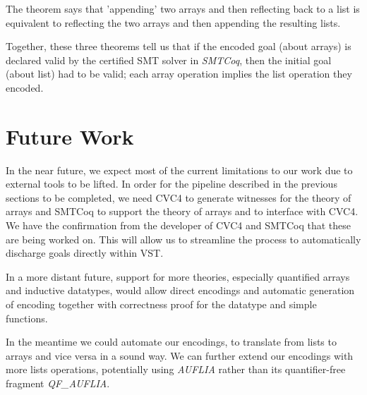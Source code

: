 \documentclass[onecolumn, preprint]{sigplanconf}
\begin{document}
The theorem says that 'appending' two arrays and then reflecting back to a list is equivalent to reflecting the two arrays and then appending the resulting lists.

Together, these three theorems tell us that if the encoded goal (about arrays) is declared valid by the certified SMT solver in \emph{SMTCoq}, then the initial goal (about list) had to be valid; each array operation implies the list operation they encoded.

\section{Future Work}
\label{sec:future}
In the near future, we expect most of the current limitations to our work due to external tools to be lifted. In order for the pipeline described in the previous sections to be completed, we need CVC4 to generate witnesses for the theory of arrays and SMTCoq to support the theory of arrays and to interface with CVC4. We have the confirmation from the developer of CVC4 and SMTCoq that these are being worked on. This will allow us to streamline the process to automatically discharge goals directly within VST. 

In a more distant future, support for more theories, especially quantified arrays and inductive datatypes, would allow direct encodings and automatic generation of encoding together with correctness proof for the datatype and simple functions.

In the meantime we could automate our encodings, to translate from lists to arrays and vice versa in a sound way. We can further extend our encodings with more lists operations, potentially using \emph{AUFLIA} rather than its quantifier-free fragment \emph{QF\_AUFLIA}.
\end{document}
